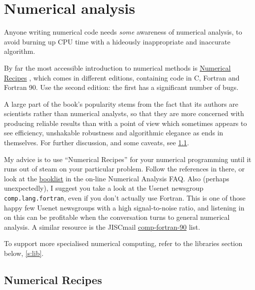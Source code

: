 \documentclass[11pt,oneside,chapters]{starlink}
\begin{document}
\section{Numerical analysis}
\label{s:na}

Anyone writing numerical code needs \emph{some} awareness
of numerical analysis, to avoid burning up CPU time with a
hideously inappropriate and inaccurate algorithm.

By far the most accessible introduction to numerical
methods is \href{http://www.nr.com}{Numerical Recipes}
\citep{nr}, which comes in
different editions, containing code in C, Fortran and
Fortran 90.  Use the second edition: the first has a
significant number of bugs.

A large part of the book's popularity stems from the fact that its
authors are scientists rather than numerical analysts, so that they
are more concerned with producing reliable results than with a point
of view which sometimes appears to see efficiency, unshakable
robustness and algorithmic elegance as ends in themselves.  For
further discussion, and some caveats, see \ref{s.nr}.

My advice is to use ``Numerical Recipes'' for your
numerical programming until it runs out of steam on your
particular problem.  Follow the references in there, or look
at the \href{http://www.mathcom.com/corpdir/techinfo.mdir/scifaq/q165.html}{booklist}
in the on-line Numerical Analysis FAQ.  Also (perhaps
unexpectedly), I suggest you take a look at the Usenet
newsgroup \texttt{comp.lang.fortran}, even if you don't
actually use Fortran.  This is one of those happy few Usenet
newsgroups with a high signal-to-noise ratio, and listening
in on this can be profitable when the conversation turns to
general numerical analysis.  A similar resource is the
JISCmail \href{http://www.jiscmail.ac.uk/lists/COMP-FORTRAN-90.html}{comp-fortran-90}
list.

To support more specialised numerical computing, refer to the
libraries section below, \ref{s:lib}.

\subsection{Numerical Recipes}
\label{s.nr}
\end{document}

